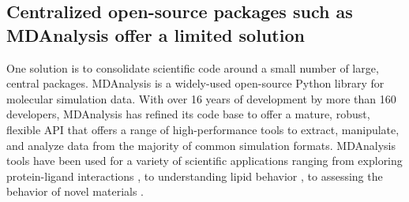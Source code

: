 \documentclass[9pt,whitepaper]{livecoms}
\begin{document}
\subsection{Centralized open-source packages such as MDAnalysis offer a limited solution}
\label{sec:centralization}

One solution is to consolidate scientific code around a small number of large, central packages. MDAnalysis \cite{michaud-agrawal_mdanalysis_2011, gowers_mdanalysis_2016} is a widely-used open-source Python library for molecular simulation data. With over 16 years of development by more than 160 developers, MDAnalysis has refined its code base to offer a mature, robust, flexible API that offers a range of high-performance tools to extract, manipulate, and analyze data from the majority of common simulation formats. MDAnalysis tools have been used for a variety of scientific applications ranging from exploring protein-ligand interactions \cite{alibay_ialibaymdrestraintsgenerator_2021, kokh_workflow_2020, bouysset_prolif_2021}, to understanding lipid behavior \cite{wilson_investigating_2021, smith_lipyphilic_2021}, to assessing the behavior of novel materials \cite{gowers_kugupukugupu_2021, loche_maicos_2022}. 
\end{document}
